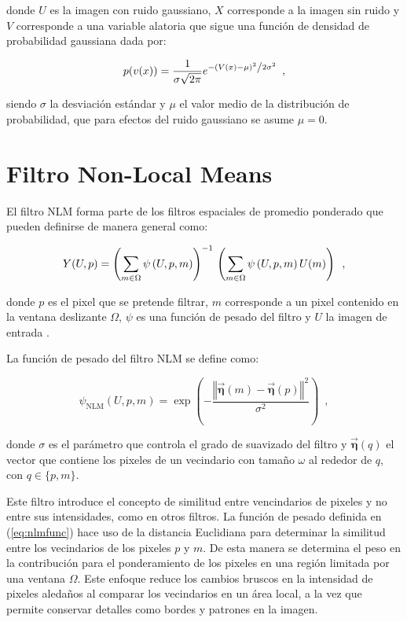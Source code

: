  donde $U$ es la imagen con ruido gaussiano, $X$ corresponde a la imagen sin ruido y $V$ corresponde a una variable alatoria que sigue una función de densidad de probabilidad gaussiana dada por: 
 
\begin{equation}
\label{eq:probfuncgauus}
p(v(x)) = \frac{1}{{\sigma \sqrt {2\pi } }}e^{{{ - \left( {V(x) - \mu } \right)^2 } \mathord{\left/ {\vphantom {{ - \left( {x - \mu } \right)^2 } {2\sigma ^2 }}} \right. \kern-\nulldelimiterspace} {2\sigma ^2 }}} \enspace ,
\end{equation}

siendo $\sigma$ la desviación est\'andar  y $\mu$ el valor medio de la distribución de probabilidad, que para efectos del ruido gaussiano se asume $\mu = 0$.


\section{Filtro Non-Local Means}
\label{ch:marco_nlm}

El filtro NLM forma parte de los filtros espaciales de promedio ponderado que pueden definirse de manera general como:

\begin{equation}
\label{eq:weighted}
Y(U,p)=\left(\sum_{m\in \Omega}\psi\left(U, p, m\right)\right)^{-1} \\ \left(\sum_{m\in \Omega}\psi\left(U, p, m\right)U(m)\right) \enspace ,
\end{equation}

donde $p$ es el pixel que se pretende filtrar, $m$ corresponde a un pixel contenido en la ventana deslizante $\Omega$, $\psi$ es una función de pesado del filtro y $U$ la imagen de entrada \cite{calderon2015dewaff}.

La función de pesado del filtro NLM se define como:

\begin{equation}
\label{eq:nlmfunc}
\psi_{\textrm{NLM}}\left(U,p,m\right) = \exp\left(-\frac{\left\Vert \vec{\boldsymbol{\eta}}\left(m\right)-\vec{\boldsymbol{\eta}}\left(p\right)\right\Vert^2 }{\sigma^{2}}\right) \enspace ,
\end{equation}

donde $\sigma$ es el par\'ametro que controla el grado de suavizado del filtro y $\vec{\boldsymbol{\eta}}\left(q\right)$ el vector que contiene los pixeles de un vecindario con tama\~no $\omega$ al rededor de $q$, con $q \in \{p,m\}$.

Este filtro introduce el concepto de similitud entre vencindarios de pixeles y no entre sus intensidades, como en otros filtros. La función de pesado definida en (\ref{eq:nlmfunc}) hace uso de la distancia Euclidiana para determinar la similitud entre los vecindarios de los pixeles $p$ y $m$. 
De esta manera se determina el peso en la contribución para el ponderamiento de los pixeles en una región limitada por una ventana $\Omega$. Este enfoque reduce los cambios bruscos en la intensidad de pixeles aleda\~nos al comparar los vecindarios en un \'area local, a la vez que permite conservar detalles como bordes y patrones en la imagen\cite{calderon2015dewaff}. 


